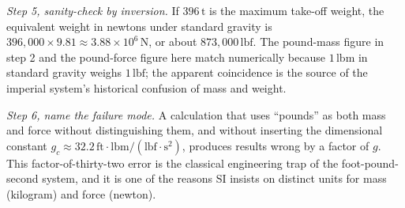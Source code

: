 \begin{exercise}
\textit{Step 5, sanity-check by inversion.} If $396\,\si{\tonne}$ is
the maximum take-off weight, the equivalent weight in newtons under
standard gravity is $396{,}000 \times 9.81 \approx 3.88 \times 10^{6}
\,\si{\newton}$, or about $873{,}000 \,\text{lbf}$. The pound-mass
figure in step 2 and the pound-force figure here match numerically
because $1 \,\text{lbm}$ in standard gravity weighs $1 \,\text{lbf}$;
the apparent coincidence is the source of the imperial system's
historical confusion of mass and weight.

\textit{Step 6, name the failure mode.} A calculation that uses
``pounds'' as both mass and force without distinguishing them, and
without inserting the dimensional constant $g_{c} \approx 32.2
\,\text{ft}\cdot\text{lbm}/(\text{lbf}\cdot\text{s}^{2})$, produces
results wrong by a factor of $g$. This factor-of-thirty-two error is
the classical engineering trap of the foot-pound-second system, and
it is one of the reasons SI insists on distinct units for mass
(kilogram) and force (newton).
\end{exercise}


